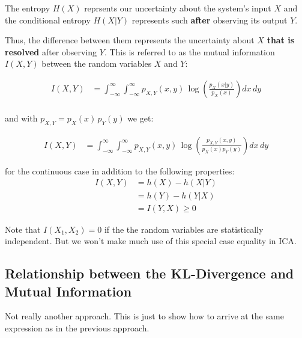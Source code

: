 The entropy $H(X)$ reprsents our uncertainty about the system's input $X$ 
and the conditional entropy $H(X|Y)$ represents such \textbf{after} observing its output $Y$.

Thus, the difference between them represents the uncertainty about $X$ \textbf{that is resolved} after observing $Y$. 
This is referred to as the mutual information $I(X,Y)$ between the random variables $X$ and $Y$:



\begin{align}
\label{eq:mutualcont1}
I(X,Y) 
&= \int_{-\infty}^{\infty} \int_{-\infty}^{\infty} p_{X,Y}(x,y) \, \log \left(\frac{p_X(x|y)}{p_X(x)}\right) dx \, dy \\
\end{align}

and with $p_{X,Y} = p_X(x)\,p_Y(y)$ we get:

\begin{align}
\label{eq:mutualcont2}
I(X,Y)
&= \int_{-\infty}^{\infty} \int_{-\infty}^{\infty} p_{X,Y}(x,y) \, \log \left(\frac{p_{X,Y}(x,y)}{p_X(x) p_Y(y)}\right) dx \, dy
\end{align}

for the continuous case in addition to the following properties:
\begin{align}
\label{eq:mutualcontprops}
I(X,Y) &= h(X) - h(X|Y)\\
&= h(Y) - h(Y|X)\\
&= I(Y,X) \ge 0
\end{align}

Note that 
$I(X_1,X_2)=0$ if the the random variables are statistically independent. But we won't make much use of this special case equality in ICA.


\newpage

\subsection{Relationship between the KL-Divergence and Mutual Information}

Not really another approach. This is just to show how to arrive at the same expression as in the previous approach.

